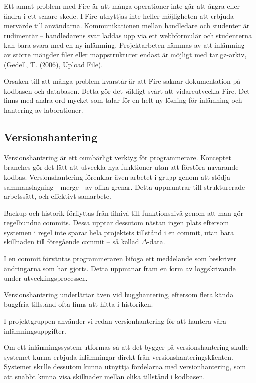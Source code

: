 Ett annat problem med Fire är att många operationer inte går att ångra eller ändra i ett senare skede. 
I Fire utnyttjas inte heller möjligheten att erbjuda mervärde till användarna. Kommunikationen mellan handledare och studenter är rudimentär – handledarens svar laddas upp via ett webbformulär och studenterna kan bara svara med en ny inlämning. Projektarbeten hämmas av att inlämning av större mängder filer eller mappstrukturer endast är möjligt med tar.gz-arkiv, (Gedell, T. (2006), Upload File).

Orsaken till att många problem kvarstår är att Fire saknar dokumentation på kodbasen och databasen. Detta gör det väldigt svårt att vidareutveckla Fire.
Det finns med andra ord mycket som talar för en helt ny lösning för inlämning och hantering av laborationer.

\subsection{Versionshantering}

Versionshantering är ett oumbärligt verktyg för programmerare. Konceptet branches gör det lätt att utveckla nya funktioner utan att förstöra nuvarande kodbas. Versionshantering förenklar även arbetet i grupp genom att  stödja sammanslagning - merge - av olika grenar. Detta uppmuntrar till strukturerade arbetssätt, och effektivt samarbete. 

Backup och historik förflyttas från filnivå till funktionsnivå genom att man gör regelbundna commits. Dessa upptar dessutom nästan ingen plats eftersom systemen i regel inte sparar hela projektets tillstånd i en commit, utan bara skillnaden till föregående commit – så kallad $\Delta$-data.

I en commit förväntas programmeraren bifoga ett meddelande som beskriver ändringarna som har gjorts. Detta uppmanar fram en form av loggskrivande under utvecklingsprocessen.

Versionshantering underlättar även vid bugghantering, eftersom flera kända buggfria tillstånd ofta finns att hitta i historiken.

I projektgruppen använder vi redan versionhantering för att hantera våra inlämningsuppgifter.

Om ett inlämningssystem utformas så att det bygger på versionshantering skulle systemet kunna erbjuda inlämningar direkt från versionshanteringsklienten. Systemet skulle dessutom kunna utnyttja fördelarna med versionhantering, som att snabbt kunna visa skillnader mellan olika tillstånd i kodbasen.

